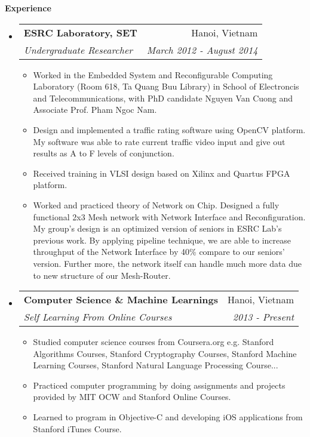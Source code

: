 \documentclass[letterpaper,11pt]{article}
\makeatletter
\newcommand{\resitem}[1]{\item #1 \vspace{-2pt}}
\newcommand{\resheading}[1]{{\large \colorbox{mygrey}{\begin{minipage}{\textwidth}{\textbf{#1 \vphantom{p\^{E}}}}\end{minipage}}}}
\newcommand{\ressubheading}[4]{
\begin{tabular*}{6.5in}{l@{\extracolsep{\fill}}r}
		\textbf{#1} & #2 \\
		\textit{#3} & \textit{#4} \\
\end{tabular*}\vspace{-6pt}}
\makeatother
\begin{document}
\resheading{Experience}
\begin{itemize}
\item
	\ressubheading{ESRC Laboratory, SET}{Hanoi, Vietnam}{Undergraduate Researcher}{March 2012 - August 2014}
	\begin{itemize}
		\resitem{Worked in the Embedded System and Reconfigurable Computing Laboratory (Room 618, Ta Quang Buu Library) in School of Electroncis and Telecommunications, with PhD candidate Nguyen Van Cuong and Associate Prof. Pham Ngoc Nam.}
		\resitem{Design and implemented a traffic rating software using OpenCV platform. My software was able to rate current traffic video input and give out results as A to F levels of conjunction.}
		\resitem{Received training in VLSI design based on Xilinx and Quartus FPGA platform.}
		\resitem{Worked and practiced theory of Network on Chip. Designed a fully functional 2x3 Mesh network with Network Interface and Reconfiguration. My group's design is an optimized version of seniors in ESRC Lab's previous work. By applying pipeline technique, we are able to increase throughput of the Network Interface by 40\% compare to our seniors' version. Further more, the network itself can handle much more data due to new structure of our Mesh-Router.}
	\end{itemize}

\item
	\ressubheading{Computer Science \& Machine Learnings}{Hanoi, Vietnam}{Self Learning From Online Courses}{2013 - Present}
	\begin{itemize}
		\resitem{Studied computer science courses from Coursera.org e.g. Stanford Algorithms Courses, Stanford Cryptography Courses, Stanford Machine Learning Courses, Stanford Natural Language Processing Course...}
		\resitem{Practiced computer programming by doing assignments and projects provided by MIT OCW and Stanford Online Courses.}
		\resitem{Learned to program in Objective-C and developing iOS applications from Stanford iTunes Course.}
	\end{itemize}
\end{itemize}
\end{document}
